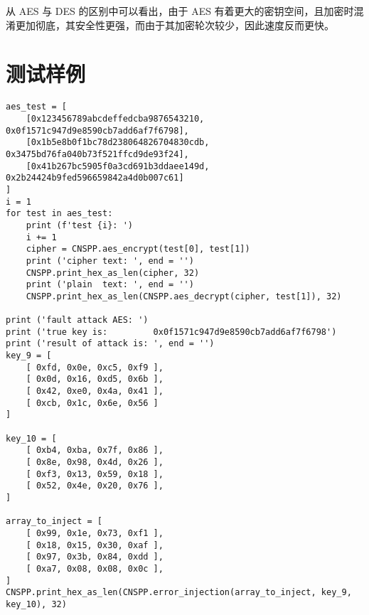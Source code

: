 \documentclass[a4paper, zihao=-4, UTF-8]{ctexart}
\begin{document}
	从 AES 与 DES 的区别中可以看出，由于 AES 有着更大的密钥空间，且加密时混淆更加彻底，其安全性更强，而由于其加密轮次较少，因此速度反而更快。
	\section{测试样例}\label{apx:testdata}
	\begin{lstlisting}[caption={AES测试样例}, label={lst:aestestdata}]
aes_test = [
	[0x123456789abcdeffedcba9876543210, 0x0f1571c947d9e8590cb7add6af7f6798], 
	[0x1b5e8b0f1bc78d238064826704830cdb, 0x3475bd76fa040b73f521ffcd9de93f24], 
	[0x41b267bc5905f0a3cd691b3ddaee149d, 0x2b24424b9fed596659842a4d0b007c61]
]
i = 1
for test in aes_test:
	print (f'test {i}: ')
	i += 1
	cipher = CNSPP.aes_encrypt(test[0], test[1])
	print ('cipher text: ', end = '')
	CNSPP.print_hex_as_len(cipher, 32)
	print ('plain  text: ', end = '')
	CNSPP.print_hex_as_len(CNSPP.aes_decrypt(cipher, test[1]), 32)

print ('fault attack AES: ')
print ('true key is:         0x0f1571c947d9e8590cb7add6af7f6798')
print ('result of attack is: ', end = '')
key_9 = [
	[ 0xfd, 0x0e, 0xc5, 0xf9 ],
	[ 0x0d, 0x16, 0xd5, 0x6b ],
	[ 0x42, 0xe0, 0x4a, 0x41 ],
	[ 0xcb, 0x1c, 0x6e, 0x56 ]
]

key_10 = [
	[ 0xb4, 0xba, 0x7f, 0x86 ],
	[ 0x8e, 0x98, 0x4d, 0x26 ],
	[ 0xf3, 0x13, 0x59, 0x18 ],
	[ 0x52, 0x4e, 0x20, 0x76 ],
]

array_to_inject = [
	[ 0x99, 0x1e, 0x73, 0xf1 ],
	[ 0x18, 0x15, 0x30, 0xaf ],
	[ 0x97, 0x3b, 0x84, 0xdd ],
	[ 0xa7, 0x08, 0x08, 0x0c ],
]
CNSPP.print_hex_as_len(CNSPP.error_injection(array_to_inject, key_9, key_10), 32)
	\end{lstlisting}
	
\end{document}
